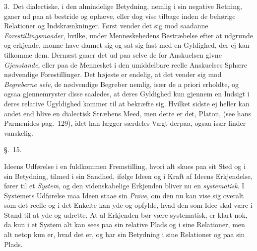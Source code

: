 \documentclass[12pt,a4paper]{book}
\newcommand{\apage}[1]{\marginnote{\footnotesize\textit{[#1]}}}
\begin{document}
3.~Det dialectiske, i den almindelige Betydning, nemlig i sin negative Retning,
gaaer ud paa at bestride og ophæve, eller dog vise tilbage inden de behørige
Relationer og Indskrænkninger. Først vender det sig mod saadanne
\emph{Forestillingsmaader}, hvilke, under Menneskehedens Bestræbelse efter at
udgrunde og erkjende, monne have dannet sig og sat sig fast med en Gyldighed, der
ej kan tilkomme dem. Dernæst gaaer det ud paa selve de for Anskuelsen givne
\emph{Gjenstande}, eller paa de Mennesket i den umiddelbare reelle Anskuelses
Sphære nødvendige Forestillinger. Det højeste er endelig, at det vender sig mod
\emph{Begreberne selv}, de nødvendige Begreber nemlig, især de a priori erholdte,
og ogsaa gjennemryster disse saaledes, at deres Gyldighed kun gjennem en Indsigt i
deres relative Ugyldighed kommer til at bekræfte sig. Hvilket sidste ej heller kan
andet end blive en dialectisk Stræbens Meed, men dette er det, Platon, (see hans
Parmenides pag.\ 129), idet han lægger særdeles Vægt derpaa, ogsaa især finder
vanskelig.

\begin{center}\large\S.~15.\end{center} \apage{133} 

Ideens Udførelse i en fuldkommen Fremstilling, hvori alt skues paa sit Sted og i
sin Betydning, tilmed i sin Sandhed, ifølge Ideen og i Kraft af Ideens
Erkjendelse, fører til et \emph{System}, og den videnskabelige Erkjenden bliver nu
en \emph{systematisk}. I Systemets Udførelse maa Ideen staae sin \emph{Prøve}, om
den nu kan vise sig overalt som det reelle og i det Enkelte kan yde og opfylde,
hvad den som Idee skal være i Stand til at yde og udrette. At al Erkjenden bør
være systematisk, er klart nok, da kun i et System alt kan sees paa sin relative
Plads og i sine Relationer, men alt netop kun er, hvad det er, og har sin Betydning
i sine Relationer og paa sin Plads.
\end{document}
